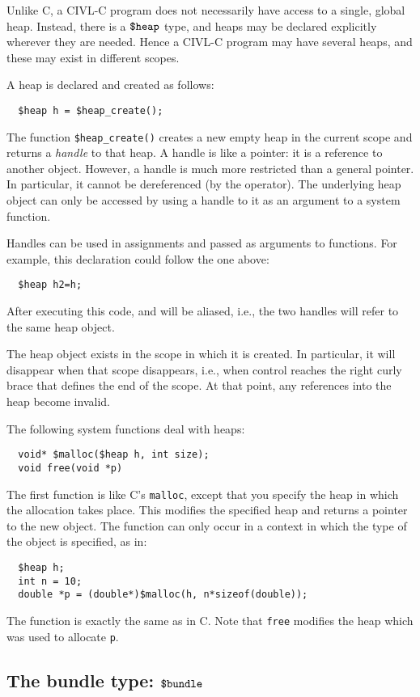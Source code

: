 Unlike C, a CIVL-C program does not necessarily have access to a
single, global heap. Instead, there is a $\mbox{\texttt{\${}heap}}$ type, and heaps may
be declared explicitly wherever they are needed. Hence a CIVL-C
program may have several heaps, and these may exist in different
scopes.

A heap is declared and created as follows:
\begin{verbatim}
  $heap h = $heap_create();
\end{verbatim}
The function \verb!$heap_create()! creates a new empty heap in the
current scope and returns a \emph{handle} to that heap. A handle is
like a pointer: it is a reference to another object. However, a handle
is much more restricted than a general pointer. In particular, it
cannot be dereferenced (by the \ct{*} operator). The underlying heap
object can only be accessed by using a handle to it as an argument to
a system function.

Handles can be used in assignments and passed as arguments to functions.
For example, this declaration could follow the one above:
\begin{verbatim}
  $heap h2=h;
\end{verbatim}
After executing this code,  and  will be aliased, i.e., the two
handles will refer to the same heap object.

The heap object exists in the scope in which it is created. In
particular, it will disappear when that scope disappears, i.e., when
control reaches the right curly brace that defines the end of the
scope. At that point, any references into the heap become invalid.

The following system functions deal with heaps:
\begin{verbatim}
  void* $malloc($heap h, int size);
  void free(void *p)
\end{verbatim}
The first function is like C's \texttt{malloc}, except that you
specify the heap in which the allocation takes place.
This modifies the specified heap and returns a pointer to the new object.
The function can only occur in a context in which the type of the object is
specified, as in:
\begin{verbatim}
  $heap h;
  int n = 10;
  double *p = (double*)$malloc(h, n*sizeof(double));
\end{verbatim}
The function  is exactly the same as in C. Note that
\texttt{free} modifies the heap which was used to allocate \texttt{p}.


\subsection{The bundle type: $\mbox{\texttt{\${}bundle}}$}

